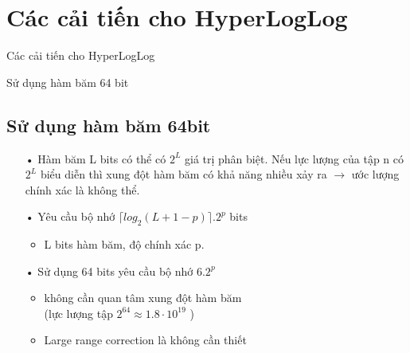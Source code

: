\documentclass{beamer}
\begin{document}
\section{Các cải tiến cho HyperLogLog }
\begin{frame}{Các cải tiến cho HyperLogLog}

\end{frame}
\begin{frame}{Sử dụng hàm băm 64 bit}
\subsection{Sử dụng hàm băm 64bit}
\begin{itemize}
\item[•] Hàm băm L bits có thể có $2^L$ giá trị phân biệt. Nếu lực lượng của tập n có $2^L$ biểu diễn thì xung đột hàm băm có khả năng nhiều xảy ra $\rightarrow$ ước lượng chính xác là không thể.
\item[•] Yêu cầu bộ nhớ $\lceil log_2(L + 1 - p) \rceil .2^p$ bits
\begin{itemize}
\item L bits hàm băm, độ chính xác p.
\end{itemize}
\item[•] Sử dụng 64 bits yêu cầu bộ nhớ $6.2^p$
\begin{itemize}
\item không cần quan tâm xung đột hàm băm \\
(lực lượng tập $2^64 \approx 1.8\cdot 10^{19}$ )
\item Large range correction là không cần thiết 
\end{itemize}
\end{itemize}
\end{frame}
\end{document}
